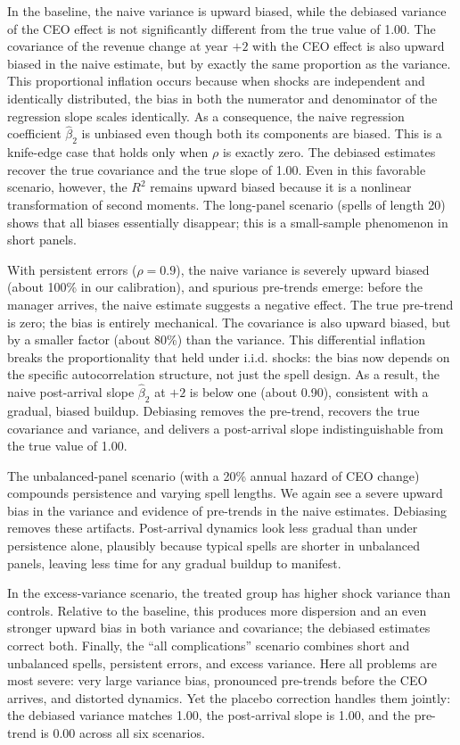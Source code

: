 \documentclass[11pt,a4paper]{article}
\begin{document}
In the baseline, the naive variance is upward biased, while the debiased variance of the CEO effect is not significantly different from the true value of 1.00. The covariance of the revenue change at year $+2$ with the CEO effect is also upward biased in the naive estimate, but by exactly the same proportion as the variance. This proportional inflation occurs because when shocks are independent and identically distributed, the bias in both the numerator and denominator of the regression slope scales identically. As a consequence, the naive regression coefficient $\hat\beta_2$ is unbiased even though both its components are biased. This is a knife-edge case that holds only when $\rho$ is exactly zero. The debiased estimates recover the true covariance and the true slope of 1.00. Even in this favorable scenario, however, the $R^2$ remains upward biased because it is a nonlinear transformation of second moments. The long-panel scenario (spells of length 20) shows that all biases essentially disappear; this is a small-sample phenomenon in short panels.

With persistent errors ($\rho=0.9$), the naive variance is severely upward biased (about 100\% in our calibration), and spurious pre-trends emerge: before the manager arrives, the naive estimate suggests a negative effect. The true pre-trend is zero; the bias is entirely mechanical. The covariance is also upward biased, but by a smaller factor (about 80\%) than the variance. This differential inflation breaks the proportionality that held under i.i.d. shocks: the bias now depends on the specific autocorrelation structure, not just the spell design. As a result, the naive post-arrival slope $\hat\beta_2$ at $+2$ is below one (about 0.90), consistent with a gradual, biased buildup. Debiasing removes the pre-trend, recovers the true covariance and variance, and delivers a post-arrival slope indistinguishable from the true value of 1.00.

The unbalanced-panel scenario (with a 20\% annual hazard of CEO change) compounds persistence and varying spell lengths. We again see a severe upward bias in the variance and evidence of pre-trends in the naive estimates. Debiasing removes these artifacts. Post-arrival dynamics look less gradual than under persistence alone, plausibly because typical spells are shorter in unbalanced panels, leaving less time for any gradual buildup to manifest.

In the excess-variance scenario, the treated group has higher shock variance than controls. Relative to the baseline, this produces more dispersion and an even stronger upward bias in both variance and covariance; the debiased estimates correct both. Finally, the ``all complications'' scenario combines short and unbalanced spells, persistent errors, and excess variance. Here all problems are most severe: very large variance bias, pronounced pre-trends before the CEO arrives, and distorted dynamics. Yet the placebo correction handles them jointly: the debiased variance matches 1.00, the post-arrival slope is 1.00, and the pre-trend is 0.00 across all six scenarios. 
\end{document}
